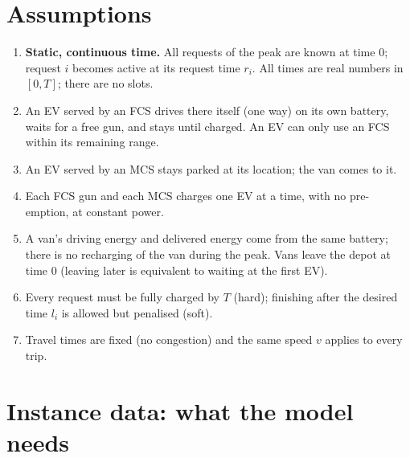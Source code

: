 \documentclass[11pt,a4paper]{article}
\begin{document}
\section{Assumptions}
\begin{enumerate}[leftmargin=1.6em,itemsep=1pt]
  \item \textbf{Static, continuous time.} All requests of the peak are known at time $0$; request $i$ becomes active at its request time $r_i$. All times are real numbers in $[0,T]$; there are no slots.
  \item An EV served by an FCS drives there itself (one way) on its own battery, waits for a free gun, and stays until charged. An EV can only use an FCS within its remaining range.
  \item An EV served by an MCS stays parked at its location; the van comes to it.
  \item Each FCS gun and each MCS charges one EV at a time, with no pre-emption, at constant power.
  \item A van's driving energy and delivered energy come from the same battery; there is no recharging of the van during the peak. Vans leave the depot at time $0$ (leaving later is equivalent to waiting at the first EV).
  \item Every request must be fully charged by $T$ (hard); finishing after the desired time $l_i$ is allowed but penalised (soft).
  \item Travel times are fixed (no congestion) and the same speed $v$ applies to every trip.
\end{enumerate}

\section{Instance data: what the model needs}\label{sec:data}
\end{document}
